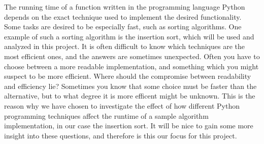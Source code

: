 The running time of a function written in the programming language Python depends on the exact technique used to implement the desired functionality. Some tasks are desired to be especially fast, such as sorting algorithms. One example of such a sorting algorithm is the insertion sort, which will be used and analyzed in this project. 
It is often difficult to know which techniques are the most efficient ones, and the answers are sometimes unexpected. Often you have to choose between a more readable implementation, and something which you might suspect to be more efficient. Where should the compromise between readability and efficiency lie? Sometimes you know that some choice must be faster than the alternative, but to what degree it is more efficent might be unknown. This is the reason why we have chosen to investigate the effect of how different Python programming techniques affect the runtime of a sample algorithm implementation, in our case the insertion sort.
It will be nice to gain some more insight into these questions, and therefore is this our focus for this project.

